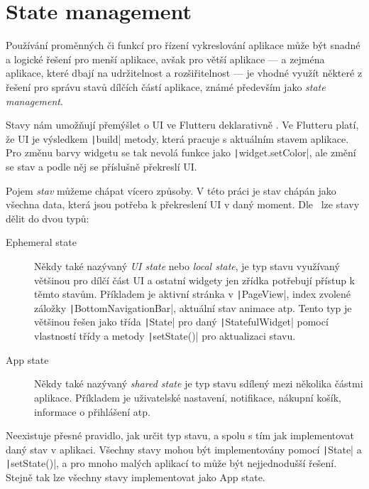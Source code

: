 \section{State management}

Používání proměnných či funkcí pro řízení vykreslování aplikace může být
snadné a logické řešení pro menší aplikace,
avšak pro větší aplikace
--- a zejména aplikace, které dbají na udržitelnost a rozšiřitelnost ---
je vhodné využít některé z řešení pro správu stavů dílčích částí aplikace,
známé především jako \emph{state management}.

Stavy nám umožňují přemýšlet o UI ve Flutteru deklarativně
\cite{flutter_state_mgmt_declarative}.
Ve Flutteru platí,
že UI je výsledkem \texttt|build| metody,
která pracuje s aktuálním stavem aplikace.
Pro změnu barvy widgetu se tak nevolá funkce jako
\texttt|widget.setColor|,
ale změní se stav a podle něj se příslušně překreslí UI.

Pojem \emph{stav} můžeme chápat vícero způsoby.
V této práci je stav chápán jako všechna data,
která jsou potřeba k překreslení UI v daný moment.
Dle~\cite{flutter_state_mgmt_ephemeral_vs_app} lze stavy dělit do dvou typů:

\begin{description}
    \item[Ephemeral state] Někdy také nazývaný \emph{UI state} nebo
    \emph{local state},
    je typ stavu využívaný většinou pro dílčí část UI
    a ostatní widgety jen zřídka potřebují přístup k těmto stavům.
    Příkladem je aktivní stránka v \texttt|PageView|,
    index zvolené záložky \texttt|BottomNavigationBar|,
    aktuální stav animace atp.
    Tento typ je většinou řešen jako třída \texttt|State| pro daný
    \texttt|StatefulWidget| pomocí vlastností třídy a metody
    \texttt|setState()| pro aktualizaci stavu.
    \item[App state] Někdy také nazývaný \emph{shared state} je typ stavu
    sdílený mezi několika částmi aplikace.
    Příkladem je uživatelské nastavení, notifikace, nákupní košík,
    informace o přihlášení atp.
\end{description}

Neexistuje přesné pravidlo,
jak určit typ stavu,
a spolu s tím jak implementovat daný stav v aplikaci.
Všechny stavy mohou být implementovány pomocí \texttt|State| a
\texttt|setState()|,
a pro mnoho malých aplikací to může být nejjednodušší řešení.
Stejně tak lze všechny stavy implementovat jako App state.
\cite{flutter_state_mgmt_ephemeral_vs_app}

